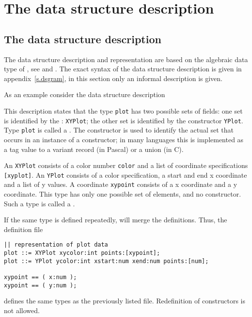 \chapter{The data structure description}
\label{s.ds}
\section{The data structure description}
The data structure description and representation are based on the algebraic
data type of {\Miranda}, see \cite{c.mira} and \cite{c.miraover}.
The exact syntax of the data structure description is given in
appendix~\ref{s.dsgram},
in this section only an informal description is given.
\par
As an example consider the data structure description
\par
\begin{listing}

\end{listing}
\label{plotds}
\par
This description states that the type {\tt plot} has two possible
sets of fields: one set is identified by the :
{\tt XYPlot}; the other set is identified by the constructor {\tt YPlot}.
Type {\tt plot} is called a .
The constructor is used to identify the actual set that occurs in an 
instance of a constructor; in many languages this is implemented as a
tag value to a variant record (in Pascal) or a union (in C).
\par
An {\tt XYPlot} consists of a color number {\tt color} and a list
of coordinate specifications {\tt [xyplot]}.
An {\tt YPlot} consists of a color specification,
a start and end x coordinate and a list of y values.
A coordinate {\tt xypoint} consists of a x coordinate and a y coordinate.
This type has only one possible set of elements, and no constructor.
Such a type is called a .
\par
If the same type is defined repeatedly, {\Tm} will merge the definitions.
Thus, the definition file
\begin{listing}
\begin{verbatim}
|| representation of plot data
plot ::= XYPlot xycolor:int points:[xypoint];
plot ::= YPlot ycolor:int xstart:num xend:num points:[num];

xypoint == ( x:num );
xypoint == ( y:num );
\end{verbatim}
\end{listing}
defines the same types as the previously listed file.
Redefinition of constructors is not allowed.
